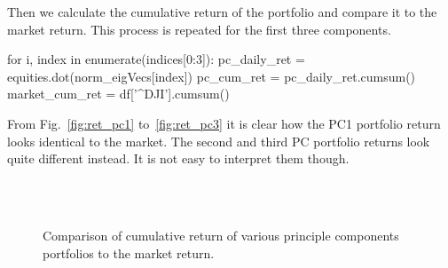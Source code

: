 Then we calculate the cumulative return of the portfolio and compare it to the market return. This process is repeated for the first three components.

\begin{ipython}
for i, index in enumerate(indices[0:3]):
    pc_daily_ret = equities.dot(norm_eigVecs[index])
    pc_cum_ret = pc_daily_ret.cumsum()
    market_cum_ret = df['^DJI'].cumsum()
\end{ipython}
	
From Fig.~\ref{fig:ret_pc1} to~\ref{fig:ret_pc3} it is clear how the PC1 portfolio return looks identical to the market. The second and third PC portfolio returns look quite different instead. It is not easy to interpret them though. 

\begin{figure}[htbp]
	\centering
		\\
	\\
	\caption{Comparison of cumulative return of various principle components portfolios to the market return.}
    \label{fig:dummy2}
\end{figure}

